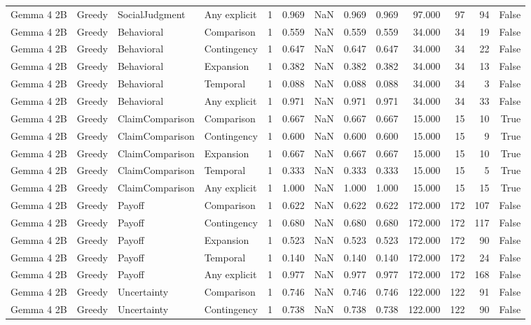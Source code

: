 \begin{tabular}{llllrrrrrrrrr}
Gemma 4 2B & Greedy & SocialJudgment & Any explicit & 1 & 0.969 & NaN & 0.969 & 0.969 & 97.000 & 97 & 94 & False \\
Gemma 4 2B & Greedy & Behavioral & Comparison & 1 & 0.559 & NaN & 0.559 & 0.559 & 34.000 & 34 & 19 & False \\
Gemma 4 2B & Greedy & Behavioral & Contingency & 1 & 0.647 & NaN & 0.647 & 0.647 & 34.000 & 34 & 22 & False \\
Gemma 4 2B & Greedy & Behavioral & Expansion & 1 & 0.382 & NaN & 0.382 & 0.382 & 34.000 & 34 & 13 & False \\
Gemma 4 2B & Greedy & Behavioral & Temporal & 1 & 0.088 & NaN & 0.088 & 0.088 & 34.000 & 34 & 3 & False \\
Gemma 4 2B & Greedy & Behavioral & Any explicit & 1 & 0.971 & NaN & 0.971 & 0.971 & 34.000 & 34 & 33 & False \\
Gemma 4 2B & Greedy & ClaimComparison & Comparison & 1 & 0.667 & NaN & 0.667 & 0.667 & 15.000 & 15 & 10 & True \\
Gemma 4 2B & Greedy & ClaimComparison & Contingency & 1 & 0.600 & NaN & 0.600 & 0.600 & 15.000 & 15 & 9 & True \\
Gemma 4 2B & Greedy & ClaimComparison & Expansion & 1 & 0.667 & NaN & 0.667 & 0.667 & 15.000 & 15 & 10 & True \\
Gemma 4 2B & Greedy & ClaimComparison & Temporal & 1 & 0.333 & NaN & 0.333 & 0.333 & 15.000 & 15 & 5 & True \\
Gemma 4 2B & Greedy & ClaimComparison & Any explicit & 1 & 1.000 & NaN & 1.000 & 1.000 & 15.000 & 15 & 15 & True \\
Gemma 4 2B & Greedy & Payoff & Comparison & 1 & 0.622 & NaN & 0.622 & 0.622 & 172.000 & 172 & 107 & False \\
Gemma 4 2B & Greedy & Payoff & Contingency & 1 & 0.680 & NaN & 0.680 & 0.680 & 172.000 & 172 & 117 & False \\
Gemma 4 2B & Greedy & Payoff & Expansion & 1 & 0.523 & NaN & 0.523 & 0.523 & 172.000 & 172 & 90 & False \\
Gemma 4 2B & Greedy & Payoff & Temporal & 1 & 0.140 & NaN & 0.140 & 0.140 & 172.000 & 172 & 24 & False \\
Gemma 4 2B & Greedy & Payoff & Any explicit & 1 & 0.977 & NaN & 0.977 & 0.977 & 172.000 & 172 & 168 & False \\
Gemma 4 2B & Greedy & Uncertainty & Comparison & 1 & 0.746 & NaN & 0.746 & 0.746 & 122.000 & 122 & 91 & False \\
Gemma 4 2B & Greedy & Uncertainty & Contingency & 1 & 0.738 & NaN & 0.738 & 0.738 & 122.000 & 122 & 90 & False \\

\end{tabular}
